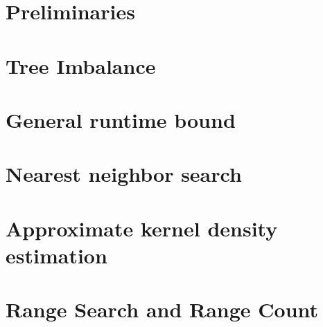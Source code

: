 \documentclass{article} %
\begin{document}

\section{Preliminaries}



\section{Tree Imbalance}



\section{General runtime bound}



\section{Nearest neighbor search}



\section{Approximate kernel density estimation}



\section{Range Search and Range Count}
\end{document}
